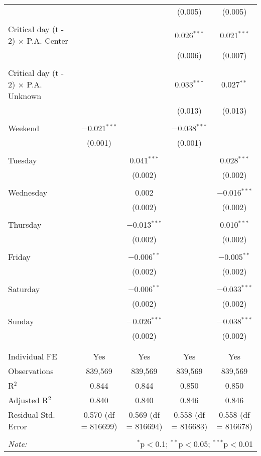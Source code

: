 \documentclass[
]{article}
\begin{document}
\begin{table}[!htbp]
{\begin{tabular}{@{\extracolsep{5pt}}lcccc}
  &  &  & (0.005) & (0.005) \\ 
  & & & & \\ 
 Critical day (t - 2) $\times$ P.A. Center &  &  & 0.026$^{***}$ & 0.021$^{***}$ \\ 
  &  &  & (0.006) & (0.007) \\ 
  & & & & \\ 
 Critical day (t - 2) $\times$ P.A. Unknown &  &  & 0.033$^{***}$ & 0.027$^{**}$ \\ 
  &  &  & (0.013) & (0.013) \\ 
  & & & & \\ 
 Weekend & $-$0.021$^{***}$ &  & $-$0.038$^{***}$ &  \\ 
  & (0.001) &  & (0.001) &  \\ 
  & & & & \\ 
 Tuesday &  & 0.041$^{***}$ &  & 0.028$^{***}$ \\ 
  &  & (0.002) &  & (0.002) \\ 
  & & & & \\ 
 Wednesday &  & 0.002 &  & $-$0.016$^{***}$ \\ 
  &  & (0.002) &  & (0.002) \\ 
  & & & & \\ 
 Thursday &  & $-$0.013$^{***}$ &  & 0.010$^{***}$ \\ 
  &  & (0.002) &  & (0.002) \\ 
  & & & & \\ 
 Friday &  & $-$0.006$^{**}$ &  & $-$0.005$^{**}$ \\ 
  &  & (0.002) &  & (0.002) \\ 
  & & & & \\ 
 Saturday &  & $-$0.006$^{**}$ &  & $-$0.033$^{***}$ \\ 
  &  & (0.002) &  & (0.002) \\ 
  & & & & \\ 
 Sunday &  & $-$0.026$^{***}$ &  & $-$0.038$^{***}$ \\ 
  &  & (0.002) &  & (0.002) \\ 
  & & & & \\ 
\hline \\[-1.8ex] 
Individual FE & Yes & Yes & Yes & Yes \\ 
Observations & 839,569 & 839,569 & 839,569 & 839,569 \\ 
R$^{2}$ & 0.844 & 0.844 & 0.850 & 0.850 \\ 
Adjusted R$^{2}$ & 0.840 & 0.840 & 0.846 & 0.846 \\ 
Residual Std. Error & 0.570 (df = 816699) & 0.569 (df = 816694) & 0.558 (df = 816683) & 0.558 (df = 816678) \\ 
\hline 
\hline \\[-1.8ex] 
\textit{Note:}  & \multicolumn{4}{r}{$^{*}$p$<$0.1; $^{**}$p$<$0.05; $^{***}$p$<$0.01} \\ 
\end{tabular}
} 
\end{table} 
\newpage
\end{document}
